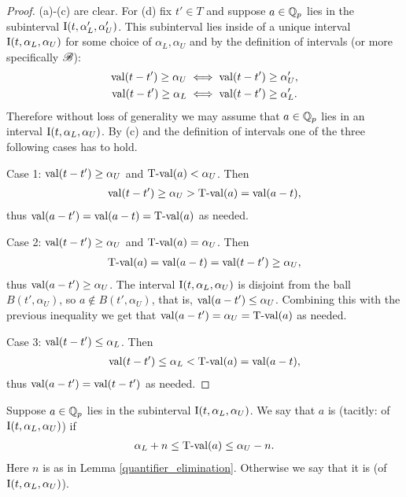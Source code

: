 \begin{proof}
  (a)-(c) are clear.
  For (d) fix $t' \in T$ and suppose $a \in \mathbb{Q}_p$ lies in the subinterval $\operatorname{I}(t, \alpha_L', \alpha_U')$.
  This  subinterval lies inside of a unique interval $\operatorname{I}(t, \alpha_L, \alpha_U)$ for some choice of $\alpha_L, \alpha_U$ and
  by the definition of intervals (or more specifically $\mathscr B$):
  \begin{align*}
    \operatorname{val}(t - t') \geq \alpha_U &\iff \operatorname{val}(t - t') \geq \alpha_U',\\
    \operatorname{val}(t - t') \geq \alpha_L &\iff \operatorname{val}(t - t') \geq \alpha_L'.
  \end{align*}
  Therefore without loss of generality we may assume that $a \in \mathbb{Q}_p$ lies in an interval $\operatorname{I}(t, \alpha_L, \alpha_U)$.
  By (c) and the definition of intervals one of the three following cases has to hold.
  
  Case 1: $\operatorname{val}(t - t') \geq \alpha_U$ and $\operatorname{T-val}(a) < \alpha_U$. Then
  \begin{align*}
    \operatorname{val}(t - t') \geq \alpha_U > \operatorname{T-val}(a) = \operatorname{val}(a - t),
  \end{align*}
  thus $\operatorname{val}(a - t') = \operatorname{val}(a - t) = \operatorname{T-val}(a)$ as needed.

  Case 2: $\operatorname{val}(t - t') \geq \alpha_U$ and $\operatorname{T-val}(a) = \alpha_U$. Then
  \begin{align*}
    \operatorname{T-val}(a) = \operatorname{val}(a - t) = \operatorname{val}(t - t') \geq \alpha_U,
  \end{align*}
  thus $\operatorname{val}(a - t') \geq \alpha_U$.
  The interval $\operatorname{I}(t, \alpha_L, \alpha_U)$ is disjoint from the ball $B(t', \alpha_U)$,
  so $a \notin B(t', \alpha_U)$, that is, $\operatorname{val}(a - t') \leq \alpha_U$.
  Combining this with the previous inequality we get that $\operatorname{val}(a - t') = \alpha_U = \operatorname{T-val}(a)$ as needed.

  Case 3: $\operatorname{val}(t - t') \leq \alpha_L$. Then
  \begin{align*}
    \operatorname{val}(t - t') \leq \alpha_L < \operatorname{T-val}(a) = \operatorname{val}(a - t),
  \end{align*}
  thus $\operatorname{val}(a - t') = \operatorname{val}(t - t')$ as needed. 
\end{proof}




\begin{Definition}
  Suppose $a \in \mathbb{Q}_p$ lies in the subinterval $\operatorname{I}(t, \alpha_L, \alpha_U)$.
  We say that $a$ is  (tacitly: of $\operatorname{I}(t, \alpha_L, \alpha_U)$) if 
    \begin{align*}
	\alpha_L + n \leq \operatorname{T-val}(a) \leq \alpha_U - n.
    \end{align*}
  Here $n$ is as in Lemma \ref{quantifier_elimination}.
  Otherwise we say that it is  (of $\operatorname{I}(t, \alpha_L, \alpha_U)$).
\end{Definition}

